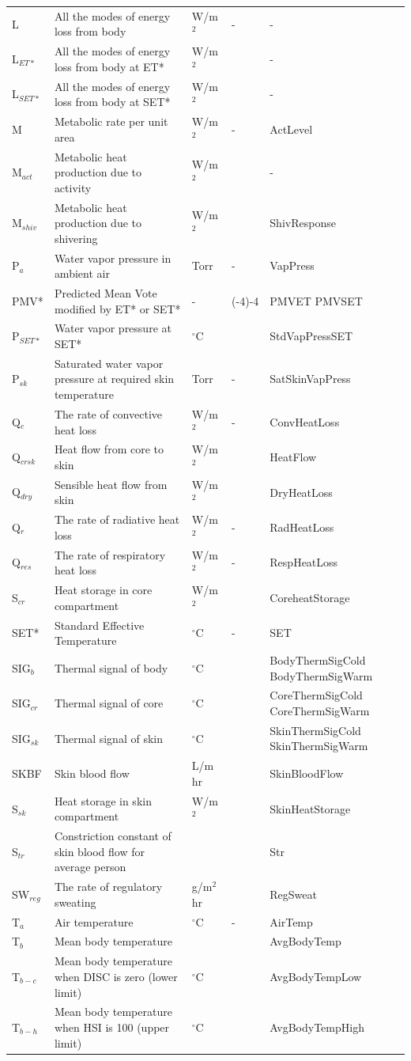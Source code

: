 \begin{longtable}[c]{p{1.2in}p{2.0in}p{0.8in}p{0.8in}p{1.2in}}
L & All the modes of energy loss from body & W/m\(^{2}\) & - & - \tabularnewline
L\(_{ET*}\) & All the modes of energy loss from body at ET* & W/m\(^{2}\) & ~ & - \tabularnewline
L\(_{SET*}\) & All the modes of energy loss from body at SET* & W/m\(^{2}\) & ~ & - \tabularnewline
M & Metabolic rate per unit area & W/m\(^{2}\) & - & ActLevel \tabularnewline
M\(_{act}\) & Metabolic heat production due to activity & W/m\(^{2}\) & ~ & - \tabularnewline
M\(_{shiv}\) & Metabolic heat production due to shivering & W/m\(^{2}\) & ~ & ShivResponse \tabularnewline
P\(_{a}\) & Water vapor pressure in ambient air & Torr & - & VapPress \tabularnewline
PMV* & Predicted Mean Vote modified by ET* or SET* & - & (-4)-4 & PMVET PMVSET \tabularnewline
P\(_{SET*}\) & Water vapor pressure at SET* & \(^{\circ}\)C & ~ & StdVapPressSET \tabularnewline
P\(_{sk}\) & Saturated water vapor pressure at required skin temperature & Torr & - & SatSkinVapPress \tabularnewline
Q\(_{c}\) & The rate of convective heat loss & W/m\(^{2}\) & - & ConvHeatLoss \tabularnewline
Q\(_{crsk}\) & Heat flow from core to skin & W/m\(^{2}\) & ~ & HeatFlow \tabularnewline
Q\(_{dry}\) & Sensible heat flow from skin & W/m\(^{2}\) & ~ & DryHeatLoss \tabularnewline
Q\(_{r}\) & The rate of radiative heat loss & W/m\(^{2}\) & - & RadHeatLoss \tabularnewline
Q\(_{res}\) & The rate of respiratory heat loss & W/m\(^{2}\) & - & RespHeatLoss \tabularnewline
S\(_{cr}\) & Heat storage in core compartment & W/m\(^{2}\) & ~ & CoreheatStorage \tabularnewline
SET* & Standard Effective Temperature & \(^{\circ}\)C & - & SET \tabularnewline
SIG\(_{b}\) & Thermal signal of body & \(^{\circ}\)C & ~ & BodyThermSigCold BodyThermSigWarm \tabularnewline
SIG\(_{cr}\) & Thermal signal of core & \(^{\circ}\)C & ~ & CoreThermSigCold CoreThermSigWarm \tabularnewline
SIG\(_{sk}\) & Thermal signal of skin & \(^{\circ}\)C & ~ & SkinThermSigCold SkinThermSigWarm \tabularnewline
SKBF & Skin blood flow & L/m  hr & ~ & SkinBloodFlow \tabularnewline
S\(_{sk}\) & Heat storage in skin compartment & W/m\(^{2}\) & ~ & SkinHeatStorage \tabularnewline
S\(_{tr}\) & Constriction constant of skin blood flow for average person & ~ & ~ & Str \tabularnewline
SW\(_{reg}\) & The rate of regulatory sweating & g/m\(^{2}\)hr & ~ & RegSweat \tabularnewline
T\(_{a}\) & Air temperature & \(^{\circ}\)C & - & AirTemp \tabularnewline
T\(_{b}\) & Mean body temperature & ~ & ~ & AvgBodyTemp \tabularnewline
T\(_{b-c}\) & Mean body temperature when DISC is zero (lower limit) & \(^{\circ}\)C & ~ & AvgBodyTempLow \tabularnewline
T\(_{b-h}\) & Mean body temperature when HSI is 100 (upper limit) & \(^{\circ}\)C & ~ & AvgBodyTempHigh \tabularnewline

\end{longtable}
